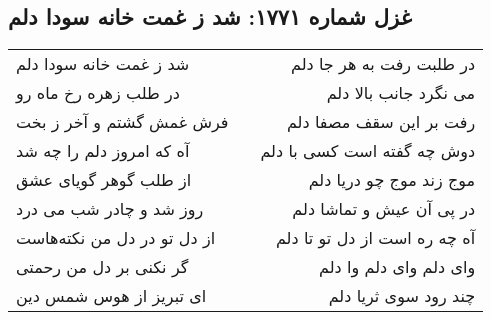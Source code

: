 \begin{center}
\section*{غزل شماره ۱۷۷۱: شد ز غمت خانه سودا دلم}
\label{sec:1771}
\begin{longtable}{l p{0.5cm} r}
شد ز غمت خانه سودا دلم
&&
در طلبت رفت به هر جا دلم
\\
در طلب زهره رخ ماه رو
&&
می نگرد جانب بالا دلم
\\
فرش غمش گشتم و آخر ز بخت
&&
رفت بر این سقف مصفا دلم
\\
آه که امروز دلم را چه شد
&&
دوش چه گفته است کسی با دلم
\\
از طلب گوهر گویای عشق
&&
موج زند موج چو دریا دلم
\\
روز شد و چادر شب می درد
&&
در پی آن عیش و تماشا دلم
\\
از دل تو در دل من نکته‌هاست
&&
آه چه ره است از دل تو تا دلم
\\
گر نکنی بر دل من رحمتی
&&
وای دلم وای دلم وا دلم
\\
ای تبریز از هوس شمس دین
&&
چند رود سوی ثریا دلم
\\
\end{longtable}
\end{center}
